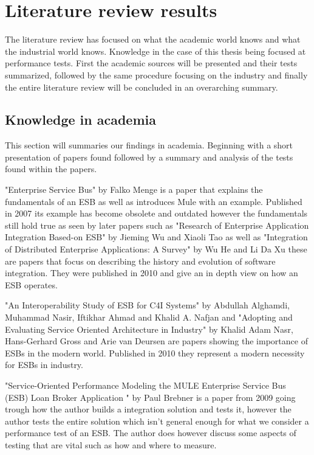 ﻿\section{Literature review results}
\label{sec:litrev}

The literature review has focused on what the academic world knows and what the industrial world knows. Knowledge in the case of this thesis being focused at performance tests.
First the academic sources will be presented and their tests summarized, followed by the same procedure focusing on the industry and finally the entire literature review will be concluded in an overarching summary.

\subsection{Knowledge in academia}
\label{sec:academia_section}
This section will summaries our findings in academia. Beginning with a short presentation of papers found followed by a summary and analysis of the tests found within the papers.


"Enterprise Service Bus"\cite{falko07} by Falko Menge is a paper that explains the fundamentals of an ESB as well as introduces Mule with an example. Published in 2007 its example has become obsolete and outdated however the fundamentals still hold true as seen by later papers such as "Research of Enterprise Application Integration Based-on ESB" \cite{Jieming2010} by Jieming Wu and Xiaoli Tao as well as "Integration of Distributed Enterprise Applications: A Survey" \cite{HeIntegration} by Wu He and Li Da Xu these are papers that focus on describing the history and evolution of software integration. They were published in 2010 and give an in depth view on how an ESB  operates.


"An Interoperability  Study  of ESB for C4I  Systems" \cite{Alghamdi2010} by Abdullah Alghamdi, Muhammad Nasir, Iftikhar Ahmad and Khalid A. Nafjan and  "Adopting and Evaluating Service Oriented Architecture in Industry" by Khalid Adam Nasr, Hans-Gerhard Gross and Arie van Deursen are papers showing the importance of ESBs in the modern world. Published in 2010 they represent a modern necessity for ESBs in industry.


"Service-Oriented Performance Modeling the MULE Enterprise Service Bus (ESB) Loan Broker Application " \cite{Brebner2009} by Paul Brebner is a paper from 2009 going trough how the author builds a integration solution and tests it, however the author tests the entire solution which isn't general enough for what we consider a performance test of an ESB. The author does however discuss some aspects of testing that are vital such as how and where to measure.

